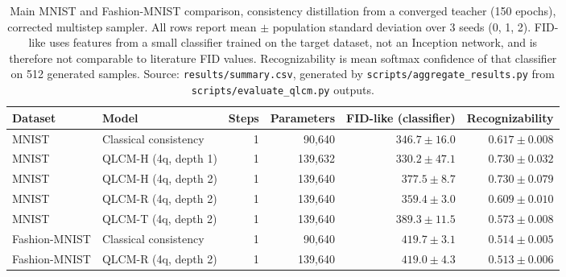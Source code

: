 \begin{table}[t]
\centering
\caption{Main MNIST and Fashion-MNIST comparison, consistency distillation
from a converged teacher (150 epochs), corrected multistep sampler. All rows
report mean $\pm$ population standard deviation over 3 seeds (0, 1, 2).
FID-like uses features from a small classifier trained on the target
dataset, not an Inception network, and is therefore not comparable to
literature FID values. Recognizability is mean softmax confidence of that
classifier on 512 generated samples. Source: \texttt{results/summary.csv},
generated by \texttt{scripts/aggregate\_results.py} from
\texttt{scripts/evaluate\_qlcm.py} outputs.}
\label{tab:main-results}
\begin{tabular}{llrrrr}
\toprule
Dataset & Model & Steps & Parameters & FID-like (classifier) & Recognizability \\
\midrule
MNIST & Classical consistency & 1 & 90{,}640 & $346.7 \pm 16.0$ & $0.617 \pm 0.008$ \\
MNIST & QLCM-H (4q, depth 1) & 1 & 139{,}632 & $330.2 \pm 47.1$ & $0.730 \pm 0.032$ \\
MNIST & QLCM-H (4q, depth 2) & 1 & 139{,}640 & $377.5 \pm 8.7$ & $0.730 \pm 0.079$ \\
MNIST & QLCM-R (4q, depth 2) & 1 & 139{,}640 & $359.4 \pm 3.0$ & $0.609 \pm 0.010$ \\
MNIST & QLCM-T (4q, depth 2) & 1 & 139{,}640 & $389.3 \pm 11.5$ & $0.573 \pm 0.008$ \\
Fashion-MNIST & Classical consistency & 1 & 90{,}640 & $419.7 \pm 3.1$ & $0.514 \pm 0.005$ \\
Fashion-MNIST & QLCM-R (4q, depth 2) & 1 & 139{,}640 & $419.0 \pm 4.3$ & $0.513 \pm 0.006$ \\
\bottomrule
\end{tabular}
\end{table}
